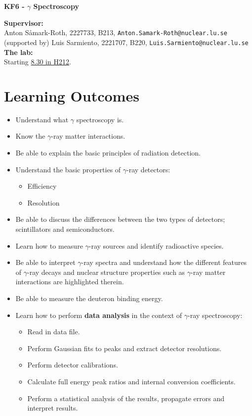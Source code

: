 \documentclass[12pt]{article}
\begin{document}
\begin{center} {\Large\bf\boldmath KF6 - $\gamma$ Spectroscopy}\\
\end{center}

{\bf Supervisor:}\\
Anton S\r{a}mark-Roth,     2227733, B213, \texttt{Anton.Samark-Roth@nuclear.lu.se}\\
(supported by) Luis Sarmiento, 2221707, B220, \texttt{Luis.Sarmiento@nuclear.lu.se}\\

{\bf The lab:}\\
Starting \underline{8.30 in H212}.
\\

\section*{Learning Outcomes}
\begin{itemize}
  \item Understand what $\gamma$ spectroscopy is.
  \item Know the $\gamma$-ray matter interactions.
  \item Be able to explain the basic principles of radiation detection.
  \item Understand the basic properties of $\gamma$-ray detectors:
  \begin{itemize}
    \item Efficiency
    \item Resolution
  \end{itemize}
  \item Be able to discuss the differences between the two types of detectors; scintillators and semiconductors.
  \item Learn how to measure $\gamma$-ray sources and identify radioactive species.
  \item Be able to interpret $\gamma$-ray spectra and understand how the different features of $\gamma$-ray decays and nuclear structure properties such as $\gamma$-ray matter interactions are highlighted therein.
  \item Be able to measure the deuteron binding energy.
  \item Learn how to perform \textbf{data analysis} in the context of $\gamma$-ray spectroscopy:
  \begin{itemize}
    \item Read in data file.
    \item Perform Gaussian fits to peaks and extract detector resolutions.
    \item Perform detector calibrations.
    \item Calculate full energy peak ratios and internal conversion coefficients.
    \item Perform a statistical analysis of the results, propagate errors and interpret results.
  \end{itemize}
\end{itemize}
\end{document}
